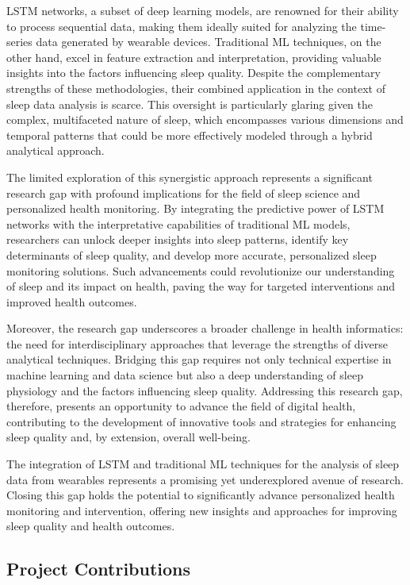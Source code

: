\documentclass[10pt]{extarticle}
\begin{document}
LSTM networks, a subset of deep learning models, are renowned for their ability to process sequential data, making them ideally suited for analyzing the time-series data generated by wearable devices. Traditional ML techniques, on the other hand, excel in feature extraction and interpretation, providing valuable insights into the factors influencing sleep quality. Despite the complementary strengths of these methodologies, their combined application in the context of sleep data analysis is scarce. This oversight is particularly glaring given the complex, multifaceted nature of sleep, which encompasses various dimensions and temporal patterns that could be more effectively modeled through a hybrid analytical approach.

The limited exploration of this synergistic approach represents a significant research gap with profound implications for the field of sleep science and personalized health monitoring. By integrating the predictive power of LSTM networks with the interpretative capabilities of traditional ML models, researchers can unlock deeper insights into sleep patterns, identify key determinants of sleep quality, and develop more accurate, personalized sleep monitoring solutions. Such advancements could revolutionize our understanding of sleep and its impact on health, paving the way for targeted interventions and improved health outcomes.

Moreover, the research gap underscores a broader challenge in health informatics: the need for interdisciplinary approaches that leverage the strengths of diverse analytical techniques. Bridging this gap requires not only technical expertise in machine learning and data science but also a deep understanding of sleep physiology and the factors influencing sleep quality. Addressing this research gap, therefore, presents an opportunity to advance the field of digital health, contributing to the development of innovative tools and strategies for enhancing sleep quality and, by extension, overall well-being.

The integration of LSTM and traditional ML techniques for the analysis of sleep data from wearables represents a promising yet underexplored avenue of research. Closing this gap holds the potential to significantly advance personalized health monitoring and intervention, offering new insights and approaches for improving sleep quality and health outcomes.

\subsection{Project Contributions}
\end{document}

